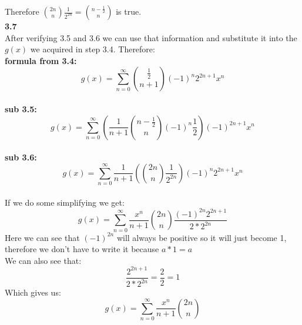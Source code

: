 \documentclass[10pt,a4paper]{report}
\begin{document}
	Therefore $\binom{2n}{n}\frac{1}{2^{2n}} = \binom{n-\frac{1}{2}}{n}$ is true.\\
	\newline
	\textbf{3.7}\\
	After verifying 3.5 and 3.6 we can use that information and substitute it into the $g(x)$ we acquired in step 3.4.  Therefore:\\
	\newline
	\textbf{formula from 3.4:} $$g(x) = \sum_{n=0}^{\infty}\binom{\frac{1}{2}}{n+1}(-1)^n2^{2n+1}x^n$$\\
	\textbf{sub 3.5:} $$g(x) = \sum_{n=0}^{\infty}(\frac{1}{n+1}\binom{n-\frac{1}{2}}{n}(-1)^n\frac{1}{2})(-1)^{2n+1}x^n$$\\ 
	\textbf{sub 3.6:} $$g(x) = \sum_{n=0}^{\infty}\frac{1}{n+1}(\binom{2n}{n}\frac{1}{2^{2n}})(-1)^n2^{2n+1}x^n$$\\
	If we do some simplifying we get:\\
	\[g(x) = \sum_{n=0}^{\infty}\frac{x^n}{n+1}\binom{2n}{n}\frac{(-1)^{2n}2^{2n+1}}{2*2^{2n}} \]
	Here we can see that $(-1)^{2n}$ will always be positive so it will just become 1, therefore we don't have to write it because $a*1 = a$\\
	We can also see that:
	\[\frac{2^{2n+1}}{2*2^{2n}} = \frac{2}{2} = 1\]
	Which gives us:
	\[g(x) = \sum_{n=0}^{\infty}\frac{x^n}{n+1}\binom{2n}{n} \]
	
\end{document}
